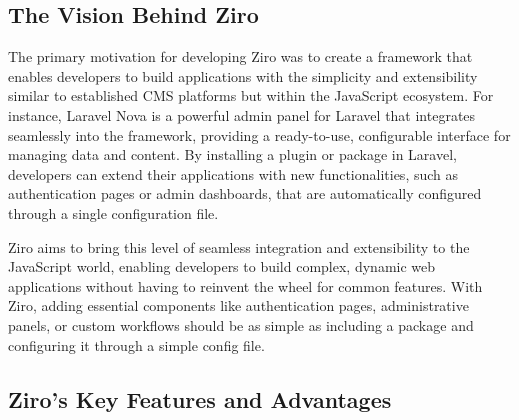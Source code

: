 \subsection*{The Vision Behind Ziro}

The primary motivation for developing Ziro was to create a framework that enables developers to build applications with the simplicity and extensibility similar to established CMS platforms but within the JavaScript ecosystem. For instance, Laravel Nova is a powerful admin panel for Laravel that integrates seamlessly into the framework, providing a ready-to-use, configurable interface for managing data and content. By installing a plugin or package in Laravel, developers can extend their applications with new functionalities, such as authentication pages or admin dashboards, that are automatically configured through a single configuration file.

Ziro aims to bring this level of seamless integration and extensibility to the JavaScript world, enabling developers to build complex, dynamic web applications without having to reinvent the wheel for common features. With Ziro, adding essential components like authentication pages, administrative panels, or custom workflows should be as simple as including a package and configuring it through a simple config file.

\subsection*{Ziro’s Key Features and Advantages}

